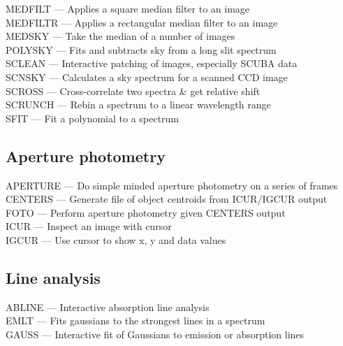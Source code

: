 \documentclass[11pt,twoside]{article}
\newcommand{\htmlref}[2]{#1}
\begin{document}
\htmlref{MEDFILT}{MEDFILT} --- Applies a square median filter to an image\\
\htmlref{MEDFILTR}{MEDFILTR} --- Applies a rectangular median filter to an image\\
\htmlref{MEDSKY}{MEDSKY} --- Take the median of a number of images\\
\htmlref{POLYSKY}{POLYSKY} --- Fits and subtracts sky from a long slit spectrum\\
\htmlref{SCLEAN}{SCLEAN} --- Interactive patching of images, especially SCUBA data\\
\htmlref{SCNSKY}{SCNSKY} --- Calculates a sky spectrum for a scanned CCD image\\
\htmlref{SCROSS}{SCROSS} --- Cross-correlate two spectra \& get relative shift\\
\htmlref{SCRUNCH}{SCRUNCH} --- Rebin a spectrum to a linear wavelength range\\
\htmlref{SFIT}{SFIT} --- Fit a polynomial to a spectrum


\subsection{\label{classifphotom}Aperture photometry}

\htmlref{APERTURE}{APERTURE} --- Do simple minded aperture photometry on a series of frames\\
\htmlref{CENTERS}{CENTERS} --- Generate file of object centroids from ICUR/IGCUR output\\
\htmlref{FOTO}{FOTO} --- Perform aperture photometry given CENTERS output\\
\htmlref{ICUR}{ICUR} --- Inspect an image with cursor\\
\htmlref{IGCUR}{IGCUR} --- Use cursor to show x, y and data values


\subsection{\label{classiflinfit}Line analysis}

\htmlref{ABLINE}{ABLINE} --- Interactive absorption line analysis\\
\htmlref{EMLT}{EMLT} --- Fits gaussians to the strongest lines in a spectrum\\
\htmlref{GAUSS}{GAUSS} --- Interactive fit of Gaussians to emission or absorption lines
\end{document}
